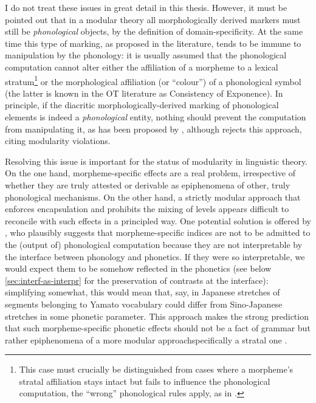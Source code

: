 I do not treat these issues in great detail in this thesis. However, it must be pointed out that in a modular theory all morphologically derived markers must still be \emph{phonological} objects, by the definition of domain\hyp specificity. At the same time this type of marking, as proposed in the literature, tends to be immune to manipulation by the phonology: it is usually assumed that the phonological computation cannot alter either the affiliation of a morpheme to a lexical stratum\footnote{This case must crucially be distinguished from cases where a morpheme's stratal affiliation stays intact but fails to influence the phonological computation, \ie the \enquote{wrong} phonological rules apply, as in \citet{jurgec10:_disjun_lexic_strat}.} or the morphological affiliation (or \enquote{colour}) of a phonological symbol (the latter is known in the OT literature as Consistency of Exponence). In principle, if the diacritic morphologically\hyp derived marking of phonological elements is indeed a \emph{phonological} entity, nothing should prevent the computation from manipulating it, as has been proposed by \citet{walker04,łubowicz09:_infix}, although \citet{van_oostendorp_coe} rejects this approach, citing modularity violations.

Resolving this issue is important for the status of modularity in linguistic theory. On the one hand, morpheme\hyp specific effects are a real problem, irrespective of whether they are truly attested or derivable as epiphenomena of other, truly phonological mechanisms. On the other hand, a strictly modular approach that enforces encapsulation and prohibits the mixing of levels appears difficult to reconcile with such effects in a principled way. One potential solution is offered by \citet{bermudez-oterong}, who plausibly suggests that morpheme\hyp specific indices are not to be admitted to the (output of) phonological computation because they are not interpretable by the interface between phonology and phonetics. If they were so interpretable, we would expect them to be somehow reflected in the phonetics (see below \cref{sec:interf-as-interpr} for the preservation of contrasts at the interface): simplifying somewhat, this would mean that, say, in Japanese stretches of segments belonging to Yamato vocabulary could differ from Sino\hyp Japanese stretches in some phonetic parameter. This approach makes the strong prediction that such morpheme\hyp specific phonetic effects should not be a fact of grammar \citep[\emph{pace} work such as that by \eg][]{pierrehumbert02:_word} but rather epiphenomena of a more modular approach\dash specifically a stratal one \citep[\cf also][]{bermudez-otero10:_curren_englis}.

